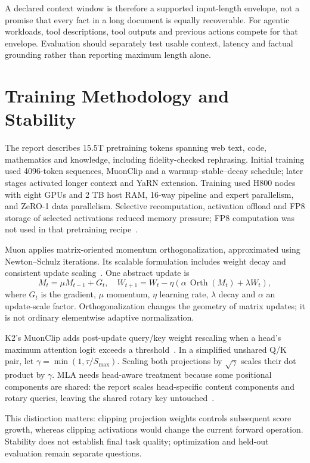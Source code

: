 \documentclass[conference]{IEEEtran}
\begin{document}
A declared context window is therefore a supported input-length envelope, not a promise that every fact in a long document is equally recoverable. For agentic workloads, tool descriptions, tool outputs and previous actions compete for that envelope. Evaluation should separately test usable context, latency and factual grounding rather than reporting maximum length alone.

\section{Training Methodology and Stability}
The report describes 15.5T pretraining tokens spanning web text, code, mathematics and knowledge, including fidelity-checked rephrasing. Initial training used 4096-token sequences, MuonClip and a warmup--stable--decay schedule; later stages activated longer context and YaRN extension. Training used H800 nodes with eight GPUs and 2 TB host RAM, 16-way pipeline and expert parallelism, and ZeRO-1 data parallelism. Selective recomputation, activation offload and FP8 storage of selected activations reduced memory pressure; FP8 computation was not used in that pretraining recipe~\cite{k2}.

Muon applies matrix-oriented momentum orthogonalization, approximated using Newton--Schulz iterations. Its scalable formulation includes weight decay and consistent update scaling~\cite{muon}. One abstract update is
\begin{equation}
M_t=\mu M_{t-1}+G_t,\quad
W_{t+1}=W_t-\eta(\alpha\,\operatorname{Orth}(M_t)+\lambda W_t),
\end{equation}
where $G_t$ is the gradient, $\mu$ momentum, $\eta$ learning rate, $\lambda$ decay and $\alpha$ an update-scale factor. Orthogonalization changes the geometry of matrix updates; it is not ordinary elementwise adaptive normalization.

K2's MuonClip adds post-update query/key weight rescaling when a head's maximum attention logit exceeds a threshold~\cite{blog}. In a simplified unshared Q/K pair, let $\gamma=\min(1,\tau/S_{\max})$. Scaling both projections by $\sqrt{\gamma}$ scales their dot product by $\gamma$. MLA needs head-aware treatment because some positional components are shared: the report scales head-specific content components and rotary queries, leaving the shared rotary key untouched~\cite{k2}.

This distinction matters: clipping projection weights controls subsequent score growth, whereas clipping activations would change the current forward operation. Stability does not establish final task quality; optimization and held-out evaluation remain separate questions.
\end{document}

